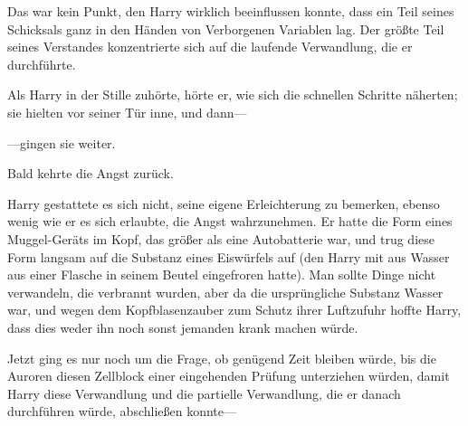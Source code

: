 Das war kein Punkt, den Harry wirklich beeinflussen konnte, dass ein Teil seines Schicksals ganz in den Händen von Verborgenen Variablen lag. Der größte Teil seines Verstandes konzentrierte sich auf die laufende Verwandlung, die er durchführte.

Als Harry in der Stille zuhörte, hörte er, wie sich die schnellen Schritte näherten; sie hielten vor seiner Tür inne, und dann—

—gingen sie weiter.

Bald kehrte die Angst zurück.

Harry gestattete es sich nicht, seine eigene Erleichterung zu bemerken, ebenso wenig wie er es sich erlaubte, die Angst wahrzunehmen. Er hatte die Form eines Muggel-Geräts im Kopf, das größer als eine Autobatterie war, und trug diese Form langsam auf die Substanz eines Eiswürfels auf (den Harry mit  aus Wasser aus einer Flasche in seinem Beutel eingefroren hatte). Man sollte Dinge nicht verwandeln, die verbrannt wurden, aber da die ursprüngliche Substanz Wasser war, und wegen dem Kopfblasenzauber zum Schutz ihrer Luftzufuhr hoffte Harry, dass dies weder ihn noch sonst jemanden krank machen würde.

Jetzt ging es nur noch um die Frage, ob genügend Zeit bleiben würde, bis die Auroren diesen Zellblock einer eingehenden Prüfung unterziehen würden, damit Harry diese Verwandlung und die partielle Verwandlung, die er danach durchführen würde, abschließen konnte—

